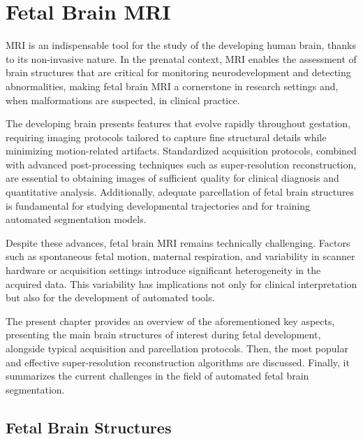 \chapter{Fetal Brain MRI} \label{chap:FetalBrainMRI}
\vspace{1cm}

MRI is an indispensable tool for the study of the developing human brain, thanks to its non-invasive nature. In the prenatal context, MRI enables the assessment of brain structures that are critical for monitoring neurodevelopment and detecting abnormalities, making fetal brain MRI a cornerstone in research settings and, when malformations are suspected, in clinical practice.

The developing brain presents features that evolve rapidly throughout gestation, requiring imaging protocols tailored to capture fine structural details while minimizing motion-related artifacts. Standardized acquisition protocols, combined with advanced post-processing techniques such as super-resolution reconstruction, are essential to obtaining images of sufficient quality for clinical diagnosis and quantitative analysis. Additionally, adequate parcellation of fetal brain structures is fundamental for studying developmental trajectories and for training automated segmentation models.

Despite these advances, fetal brain MRI remains technically challenging. Factors such as spontaneous fetal motion, maternal respiration, and variability in scanner hardware or acquisition settings introduce significant heterogeneity in the acquired data. This variability has implications not only for clinical interpretation but also for the development of automated tools.

The present chapter provides an overview of the aforementioned key aspects, presenting the main brain structures of interest during fetal development, alongside typical acquisition and parcellation protocols. Then, the most popular and effective super-resolution reconstruction algorithms are discussed. Finally, it summarizes the current challenges in the field of automated fetal brain segmentation.

\section{Fetal Brain Structures}

